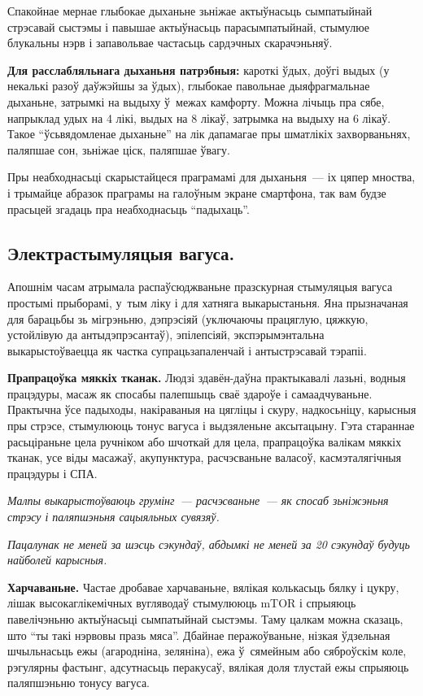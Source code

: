 Спакойнае мернае глыбокае дыханьне зьніжае актыўнасьць сымпатыйнай стрэсавай сыстэмы і павышае актыўнасьць парасымпатыйнай, стымулюе блукальны нэрв і запавольвае частасьць сардэчных скарачэньняў.

\textbf{Для расслабляльнага дыханьня патрэбныя:} кароткі ўдых, доўгі выдых (у некалькі разоў даўжэйшы за ўдых), глыбокае павольнае дыяфрагмальнае дыханьне, затрымкі на выдыху ў~межах камфорту. Можна лічыць пра сябе, напрыклад удых на 4 лікі, выдых на 8 лікаў, затрымка на выдыху на 6 лікаў. Такое ``ўсьвядомленае дыханьне'' на лік дапамагае пры шматлікіх захворваньнях, паляпшае сон, зьніжае ціск, паляпшае ўвагу. 

Пры неабходнасьці скарыстайцеся праграмамі для дыханьня~--- іх цяпер мноства, і трымайце абразок праграмы на галоўным экране смартфона, так вам будзе прасьцей згадаць пра неабходнасьць ``падыхаць''.

\subsection*{Электрастымуляцыя вагуса.}

Апошнім часам атрымала распаўсюджваньне празскурная стымуляцыя вагуса простымі прыборамі, у~тым ліку і для хатняга выкарыстаньня. Яна прызначаная для барацьбы зь мігрэньню, дэпрэсіяй (уключаючы працяглую, цяжкую, устойлівую да антыдэпрэсантаў), эпілепсіяй, экспэрымэнтальна выкарыстоўваецца як частка супрацьзапаленчай і антыстрэсавай тэрапіі.

\textbf{Прапрацоўка мяккіх тканак.} Людзі здавён-даўна практыкавалі лазьні, водныя працэдуры, масаж як спосабы палепшыць сваё здароўе і самаадчуваньне. Практычна ўсе падыходы, накіраваныя на цягліцы і скуру, надкосьніцу, карысныя пры стрэсе, стымулююць тонус вагуса і выдзяленьне аксытацыну. Гэта стараннае расьціраньне цела ручніком або шчоткай для цела, прапрацоўка валікам мяккіх тканак, усе віды масажаў, акупунктура, расчэсваньне валасоў, касмэталягічныя працэдуры і СПА. 

\emph{Малпы выкарыстоўваюць грумінг~--- расчэсваньне~--- як спосаб зьніжэньня стрэсу і паляпшэньня сацыяльных сувязяў.}

\emph{Пацалунак не меней за шэсць сэкундаў, абдымкі не меней за 20 сэкундаў будуць найболей карысныя.}

\textbf{Харчаваньне.} Частае дробавае харчаваньне, вялікая колькасьць бялку і цукру, лішак высокаглікемічных вугляводаў стымулююць mTOR і спрыяюць павелічэньню актыўнасьці сымпатыйнай сыстэмы. Таму цалкам можна сказаць, што ``ты такі нэрвовы празь мяса''. Дбайнае перажоўваньне, нізкая ўдзельная шчыльнасьць ежы (агародніна, зеляніна), ежа ў~сямейным або сяброўскім коле, рэгулярны фастынг, адсутнасьць перакусаў, вялікая доля тлустай ежы спрыяюць паляпшэньню тонусу вагуса. 

